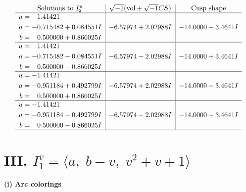 \documentclass[1p]{elsarticle_modified}
\theoremstyle{definition}
\newcommand{\I}{\sqrt{-1}}
\begin{document}
$$\begin{array}{c|c|c}  
\text{Solutions to }I^u_{2}& \I (\text{vol} + \sqrt{-1}CS) & \text{Cusp shape}\\
 \hline 
\begin{aligned}
u &= \phantom{-}1.41421\phantom{ +0.000000I} \\
a &= -0.715482 + 0.084551 I \\
b &= \phantom{-}0.500000 + 0.866025 I\end{aligned}
 & -6.57974 + 2.02988 I & -14.0000 - 3.4641 I \\ \hline\begin{aligned}
u &= \phantom{-}1.41421\phantom{ +0.000000I} \\
a &= -0.715482 - 0.084551 I \\
b &= \phantom{-}0.500000 - 0.866025 I\end{aligned}
 & -6.57974 - 2.02988 I & -14.0000 + 3.4641 I \\ \hline\begin{aligned}
u &= -1.41421\phantom{ +0.000000I} \\
a &= -0.951184 + 0.492799 I \\
b &= \phantom{-}0.500000 + 0.866025 I\end{aligned}
 & -6.57974 + 2.02988 I & -14.0000 - 3.4641 I \\ \hline\begin{aligned}
u &= -1.41421\phantom{ +0.000000I} \\
a &= -0.951184 - 0.492799 I \\
b &= \phantom{-}0.500000 - 0.866025 I\end{aligned}
 & -6.57974 - 2.02988 I & -14.0000 + 3.4641 I\\
 \hline 
 \end{array}$$\newpage\newpage\renewcommand{\arraystretch}{1}
\centering \section*{III. $I^v_{1}= \langle a,\;b- v,\;v^2+v+1 \rangle$}
\flushleft \textbf{(i) Arc colorings}\\
\end{document}
